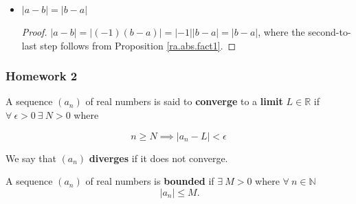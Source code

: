 \begin{itemize}
\begin{proof}
\begin{itemize}
\item \textbf{Case 1:} \(x \geq y\). Then \(|x - y| = x - y\). We know \(a < x < b \implies 0 < x - a < b - a\). 

\[
a < y \implies -a > -y \implies x - a > x -y \implies x - y < x - a < b - a
\]

\[
\implies \boxed{|x - y| < b - a}
\]


\item \textbf{Case 2:} \(x < y\). Then \(|x - y| = y - x\). We know \(a < y < b \implies 0 < y - a < b - a\).

\[
a < x \implies -a > -x \implies y - a > y - x \implies y - x < y - a < b - a
\]

\[
\implies \boxed{|x - y| < b - a}
\]

\end{itemize}

\end{proof}

\item \begin{proposition}\label{ra.abs.fact.a} \(|a - b| = |b - a|\) \end{proposition}

\begin{proof} \(|a - b| = |(-1)(b - a)| = |-1||b-a| = |b - a|\), where the second-to-last step follows from Proposition \ref{ra.abs.fact1}.

\end{proof}

\end{itemize}

\subsubsection{Homework 2}

\begin{definition}  A sequence \((a_n)\) of real numbers is said to \textbf{converge} to a \textbf{limit} \(L \in \mathbb{R}\) if \(\forall \ \epsilon > 0 \ \exists \ N > 0 \) where

\[
n \geq N \implies |a_n - L| < \epsilon
\]

We say that \((a_n)\) \textbf{diverges} if it does not converge.

\end{definition}

\begin{definition} A sequence \((a_n)\) of real numbers is \textbf{bounded} if \(\exists \ M > 0\) where \(\forall \ n \in \mathbb{N}\) \[\ |a_n| \leq M .\]

\end{definition}


